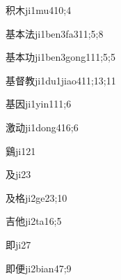 \begin{verbete}{积木}{ji1mu4}{10;4}
\end{verbete}

\begin{verbete}{基本法}{ji1ben3fa3}{11;5;8}
\end{verbete}

\begin{verbete}{基本功}{ji1ben3gong1}{11;5;5}
\end{verbete}

\begin{verbete}{基督教}{ji1du1jiao4}{11;13;11}
\end{verbete}

\begin{verbete}{基因}{ji1yin1}{11;6}
\end{verbete}

\begin{verbete}{激动}{ji1dong4}{16;6}
\end{verbete}

\begin{verbete}{鷄}{ji1}{21}
\end{verbete}

\begin{verbete}{及}{ji2}{3}
\end{verbete}

\begin{verbete}{及格}{ji2ge2}{3;10}
\end{verbete}

\begin{verbete}{吉他}{ji2ta1}{6;5}
\end{verbete}

\begin{verbete}{即}{ji2}{7}
\end{verbete}

\begin{verbete}{即便}{ji2bian4}{7;9}
\end{verbete}

